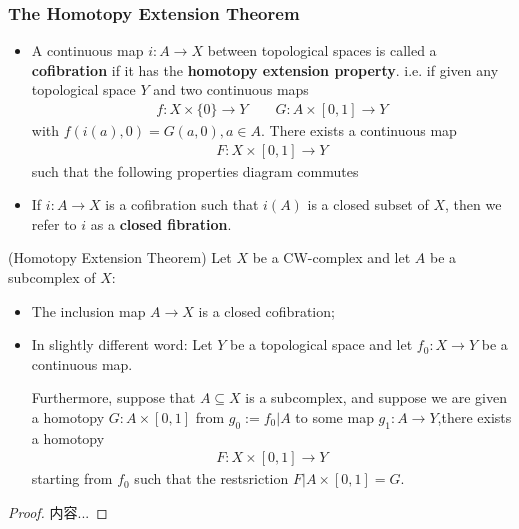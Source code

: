\documentclass[Total.tex]{subfiles}
\begin{document}
		\subsubsection{The Homotopy Extension Theorem}
		\begin{Def}
			 \begin{itemize}
			 	\item A continuous map $i:A\rightarrow X$ between topological spaces is called a \textbf{cofibration} if it has the \textbf{homotopy extension property}. i.e. if given any topological space $Y$ and two continuous maps
			 	\begin{gather*}
			 		f:X\times \{0\}\rightarrow Y\qquad G:A\times [0,1]\rightarrow Y
			 	\end{gather*}
			 	with $f(i(a),0)=G(a,0),a\in A$. There exists a continuous map
			 	\begin{gather*}
			 		F:X\times [0,1]\rightarrow Y
			 	\end{gather*}
			 	such that the following properties diagram commutes
			 	\begin{center}
			 	\end{center}
			 	\item If $i:A\rightarrow X$ is a cofibration such that $i(A)$ is a closed subset of $X$, then we refer to $i$ as a \textbf{closed fibration}.
			 \end{itemize}
		\end{Def}
		\begin{theorem}
			(Homotopy Extension Theorem) Let $X$ be a CW-complex and let $A$ be a subcomplex of $X$:
			\begin{itemize}
				\item The inclusion map $A\rightarrow X$ is a closed cofibration;
				\item In slightly different word: Let $Y$ be a topological space and let $f_0:X\rightarrow Y$ be a continuous map. 
				
				Furthermore, suppose that $A\subseteq X$ is a subcomplex, and suppose we are given a homotopy $G:A\times [0,1]$ from $g_0:=f_0|A$ to some map $g_1:A\rightarrow Y$,there exists a homotopy
				\begin{gather*}
					F:X\times [0,1]\rightarrow Y
				\end{gather*}
				starting from $f_0$ such that the restsriction $F|A\times [0,1]=G$.
			\end{itemize}
		\end{theorem}
		\begin{proof}
			内容...
		\end{proof}
		
\end{document}
